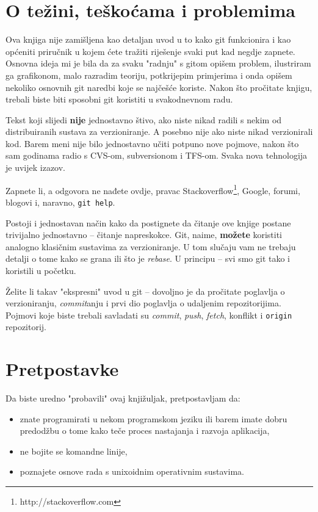 \section*{O težini, teškoćama i problemima}

Ova knjiga nije zamišljena kao detaljan uvod u to kako git funkcionira i kao općeniti priručnik u kojem ćete tražiti riješenje svaki put kad negdje zapnete.
Osnovna ideja mi je bila da za svaku "radnju" s gitom opišem problem, ilustriram ga grafikonom, malo razradim teoriju, potkrijepim primjerima i onda opišem nekoliko osnovnih git naredbi koje se najčešće koriste.
Nakon što pročitate knjigu, trebali biste biti sposobni git koristiti u svakodnevnom radu. 

Tekst koji slijedi \textbf{nije} jednostavno štivo, ako niste nikad radili s nekim od distribuiranih sustava za verzioniranje.
A posebno nije ako niste nikad verzionirali kod.
Barem meni nije bilo jednostavno učiti potpuno nove pojmove, nakon što sam godinama radio s CVS-om, subversionom i TFS-om.
Svaka nova tehnologija je uvijek izazov.

Zapnete li, a odgovora ne nađete ovdje, pravac Stackoverflow\footnote{http://stackoverflow.com}, Google, 
forumi, blogovi i, naravno, \verb+git help+.

Postoji i jednostavan način kako da postignete da čitanje ove knjige postane trivijalno jednostavno -- čitanje napreskokce.
Git, naime, \textbf{možete} koristiti analogno klasičnim sustavima za verzioniranje. 
U tom slučaju vam ne trebaju detalji o tome kako se grana ili što je \emph{rebase}.
U principu -- svi smo git tako i koristili u početku.

Želite li takav "ekspresni" uvod u git -- dovoljno je da pročitate poglavlja o verzioniranju, \emph{commit}anju i prvi dio poglavlja o udaljenim repozitorijima.
Pojmovi koje biste trebali savladati su \emph{commit}, \emph{push}, \emph{fetch}, konflikt i \verb+origin+ repozitorij.

\section*{Pretpostavke}

Da biste uredno "probavili" ovaj knjižuljak, pretpostavljam da:

\begin{itemize}
	\item znate programirati u nekom programskom jeziku ili barem imate dobru predodžbu o tome kako teče proces nastajanja i razvoja aplikacija,
	\item ne bojite se komandne linije,
	\item poznajete osnove rada s unixoidnim operativnim sustavima.
\end{itemize}

